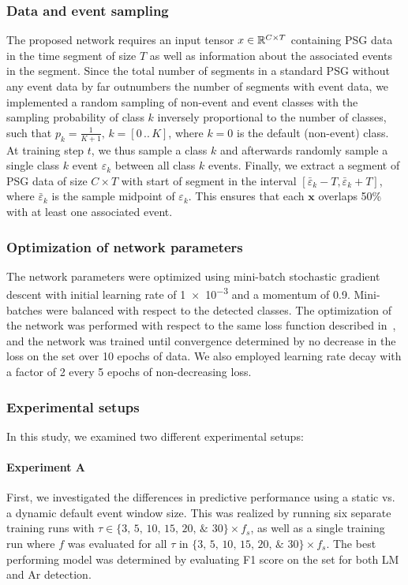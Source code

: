 \subsubsection{Data and event sampling}
The proposed network requires an input tensor $x \in \mathbb{R}^{C \times T}$ containing \ac{PSG} data in the time segment of size $T$ as well as information about the associated events in the segment.
Since the total number of segments in a standard \ac{PSG} without any event data by far outnumbers the number of segments with event data, we implemented a random sampling of non-event and event classes with the sampling probability of class $k$ inversely proportional to the number of classes, such that $p_k = \frac{1}{K+1},\,k=\left[0\,..\,K \right]$, where $k=0$ is the default (non-event) class.
At training step $t$, we thus sample a class $k$ and afterwards randomly sample a single class $k$ event $\varepsilon_{k}$ between all class $k$ events.
Finally, we extract a segment of \ac{PSG} data of size $C \times T$ with start of segment in the interval $\left[ \bar{\varepsilon}_{k} - T, \bar{\varepsilon}_{k} + T \right]$, where $\bar{\varepsilon}_{k}$ is the sample midpoint of $\varepsilon_{k}$.
This ensures that each $\mathbf{x}$ overlaps 50\% with at least one associated event.

\subsubsection{Optimization of network parameters}
The network parameters were optimized using mini-batch stochastic gradient descent with initial learning rate of \num[retain-unity-mantissa = false]{1e-3} and a momentum of \num{0.9}. 
Mini-batches were balanced with respect to the detected classes. 
The optimization of the network was performed with respect to the same loss function described in~\cite{Chambon2018b,Chambon2019}, and the network was trained until convergence determined by no decrease in the loss on the \eval set over 10 epochs of \train data. 
We also employed learning rate decay with a factor of 2 every 5 epochs of non-decreasing \eval loss.

\subsubsection{Experimental setups}
In this study, we examined two different experimental setups:
\paragraph{Experiment A} First, we investigated the differences in predictive performance using a static vs. a dynamic default event window size. 
This was realized by running six separate training runs with $\tau \in \lbrace \numlist[list-final-separator={, }]{3;5;10;15;20;30} \rbrace \times f_{s}$, as well as a single training run where $f$ was evaluated for all $\tau$ in $\lbrace \numlist[list-final-separator={, }]{3;5;10;15;20;30} \rbrace \times f_{s}$. 
The best performing model was determined by evaluating F1 score on the \eval set for both \ac{LM} and \ac{Ar} detection. 
